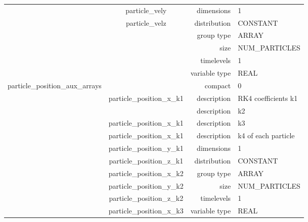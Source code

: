\begin{tabular*}{150mm}{|c|c@{\extracolsep{\fill}}|rl|}
 & particle\_vely & dimensions & 1 \\ 
 & particle\_velz & distribution & CONSTANT \\ 
 &  & group type & ARRAY \\ 
 &  & size & NUM\_PARTICLES \\ 
 &  & timelevels & 1 \\ 
 &  & variable type & REAL \\ 
\hline 
particle\_position\_aux\_arrays &  & compact & 0 \\ 
 & particle\_position\_x\_k1 & description & RK4 coefficients k1 \\ 
& ~ & description & k2 \\ 
 & particle\_position\_x\_k1 & description & k3 \\ 
 & particle\_position\_x\_k1 & description & k4 of each particle \\ 
 & particle\_position\_y\_k1 & dimensions & 1 \\ 
 & particle\_position\_z\_k1 & distribution & CONSTANT \\ 
 & particle\_position\_x\_k2 & group type & ARRAY \\ 
 & particle\_position\_y\_k2 & size & NUM\_PARTICLES \\ 
 & particle\_position\_z\_k2 & timelevels & 1 \\ 
 & particle\_position\_x\_k3 & variable type & REAL \\ 
\hline 
\end{tabular*} 



\vspace{5mm}
\vspace{5mm}

